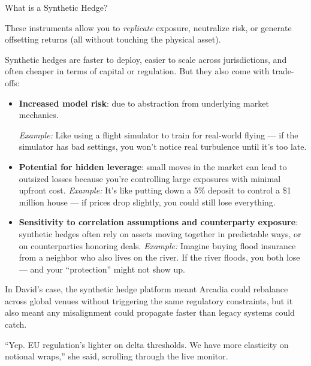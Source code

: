 \begin{TechnicalSidebar}{What is a Synthetic Hedge?}
  \medskip

  These instruments allow you to \textit{replicate} exposure, neutralize risk, or generate offsetting returns (all without 
  touching the physical asset).

  \medskip

  Synthetic hedges are faster to deploy, easier to scale across jurisdictions, and often cheaper in terms of capital 
  or regulation. But they also come with trade-offs:

  \medskip

  \begin{itemize}
    \item \textbf{Increased model risk}: due to abstraction from underlying market mechanics.  

    \medskip
    \textit{Example:} Like using a flight simulator to train for real-world flying — if the simulator has bad settings, you won’t notice real turbulence until it’s too late.
    \medskip
  
    \item \textbf{Potential for hidden leverage}: small moves in the market can lead to outsized losses because you're controlling large exposures with minimal upfront cost.  
    \medskip
    \textit{Example:} It's like putting down a 5\% deposit to control a \$1 million house — if prices drop slightly, you could still lose everything.
    \medskip
  
    \item \textbf{Sensitivity to correlation assumptions and counterparty exposure}: synthetic hedges often rely on assets moving together in predictable ways, or on counterparties honoring deals.  
    \medskip
    \textit{Example:} Imagine buying flood insurance from a neighbor who also lives on the river. If the river floods, you both lose — and your “protection” might not show up.
  \end{itemize}
  

  \medskip

  In David’s case, the synthetic hedge platform meant Arcadia could rebalance across global venues without triggering 
  the same regulatory constraints, but it also meant any misalignment could propagate faster than legacy systems 
  could catch.

\end{TechnicalSidebar}

\medskip

``Yep. EU regulation’s lighter on delta thresholds. We have more elasticity on notional wraps,'' she said, 
scrolling through the live monitor.



